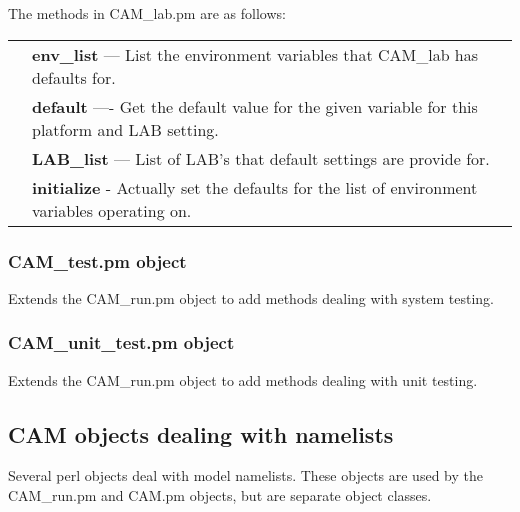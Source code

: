 \documentclass[]{article}
\begin{document}
The methods in CAM\_lab.pm are as follows:\\

\begin{tabular}{r p{3.7in}}
	& {\bf env\_list} --- List the environment variables that CAM\_lab has defaults for. \\
	& {\bf default} ---- Get the default value for the given variable for this platform
                            and LAB setting.\\
	& {\bf LAB\_list} --- List of LAB's that default settings are provide for.\\
	& {\bf initialize} - Actually set the defaults for the list of environment
	variables operating on.
\end{tabular}
\subsubsection{CAM\_test.pm object}
Extends the CAM\_run.pm object to add methods dealing with system testing.
\subsubsection{CAM\_unit\_test.pm object}
Extends the CAM\_run.pm object to add methods dealing with unit testing.
\subsection{CAM objects dealing with namelists}
Several perl objects deal with model namelists. These objects are used by the CAM\_run.pm and
CAM.pm objects, but are separate object classes.
\end{document}
